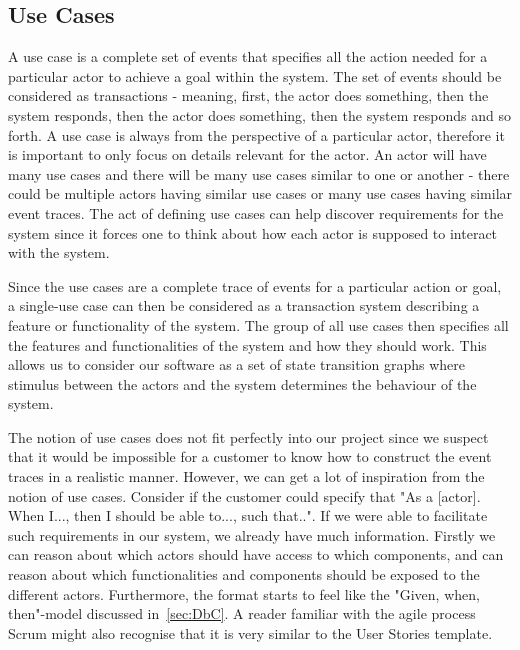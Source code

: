 \subsection{Use Cases}
A use case is a complete set of events that specifies all the action needed for a particular actor to achieve a goal within the system. 
The set of events should be considered as transactions - meaning, first, the actor does something, then the system responds, then the actor does something, then the system responds and so forth. 
A use case is always from the perspective of a particular actor, therefore it is important to only focus on details relevant for the actor. 
An actor will have many use cases and there will be many use cases similar to one or another - there could be multiple actors having similar use cases or many use cases having similar event traces. 
The act of defining use cases can help discover requirements for the system since it forces one to think about how each actor is supposed to interact with the system.

Since the use cases are a complete trace of events for a particular action or goal, a single-use case can then be considered as a transaction system describing a feature or functionality of the system. 
The group of all use cases then specifies all the features and functionalities of the system and how they should work. 
This allows us to consider our software as a set of state transition graphs where stimulus between the actors and the system determines the behaviour of the system.

The notion of use cases does not fit perfectly into our project since we suspect that it would be impossible for a customer to know how to construct the event traces in a realistic manner. 
However, we can get a lot of inspiration from the notion of use cases. 
Consider if the customer could specify that "As a [actor]. When I..., then I should be able to..., such that..".
If we were able to facilitate such requirements in our system, we already have much information.
Firstly we can reason about which actors should have access to which components, and can reason about which functionalities and components should be exposed to the different actors.
Furthermore, the format starts to feel like the "Given, when, then"-model discussed in~\autoref{sec:DbC}.
A reader familiar with the agile process Scrum might also recognise that it is very similar to the User Stories template.
